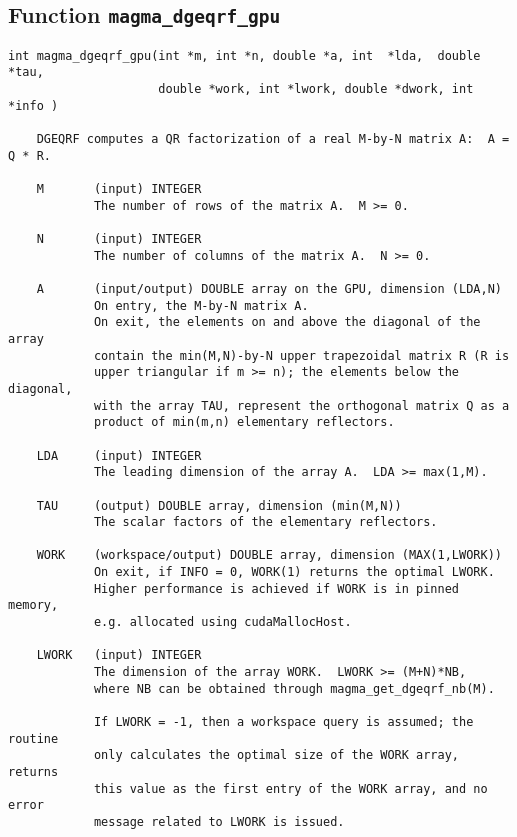 \documentclass[10pt]{book}
\begin{document}
\newpage
\subsection{Function {\tt {\bf magma\_dgeqrf\_gpu}}}
\begin{verbatim}
int magma_dgeqrf_gpu(int *m, int *n, double *a, int  *lda,  double  *tau,
                     double *work, int *lwork, double *dwork, int *info )
   
    DGEQRF computes a QR factorization of a real M-by-N matrix A:  A = Q * R.   

    M       (input) INTEGER   
            The number of rows of the matrix A.  M >= 0.   

    N       (input) INTEGER   
            The number of columns of the matrix A.  N >= 0.   

    A       (input/output) DOUBLE array on the GPU, dimension (LDA,N)   
            On entry, the M-by-N matrix A.   
            On exit, the elements on and above the diagonal of the array   
            contain the min(M,N)-by-N upper trapezoidal matrix R (R is   
            upper triangular if m >= n); the elements below the diagonal,   
            with the array TAU, represent the orthogonal matrix Q as a   
            product of min(m,n) elementary reflectors.

    LDA     (input) INTEGER   
            The leading dimension of the array A.  LDA >= max(1,M).   

    TAU     (output) DOUBLE array, dimension (min(M,N))   
            The scalar factors of the elementary reflectors.   

    WORK    (workspace/output) DOUBLE array, dimension (MAX(1,LWORK))   
            On exit, if INFO = 0, WORK(1) returns the optimal LWORK.   
            Higher performance is achieved if WORK is in pinned memory, 
            e.g. allocated using cudaMallocHost.

    LWORK   (input) INTEGER   
            The dimension of the array WORK.  LWORK >= (M+N)*NB,   
            where NB can be obtained through magma_get_dgeqrf_nb(M).

            If LWORK = -1, then a workspace query is assumed; the routine   
            only calculates the optimal size of the WORK array, returns   
            this value as the first entry of the WORK array, and no error   
            message related to LWORK is issued.   


\end{verbatim}
\end{document}
